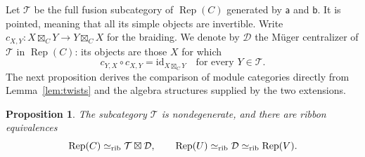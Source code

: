 \documentclass[11pt,reqno]{amsart}
\newtheorem{proposition}[theorem]{Proposition}
\theoremstyle{definition}\newtheorem{definition}[theorem]{Definition}
\theoremstyle{remark}\newtheorem{remark}[theorem]{Remark}
\newcommand{\Rep}{\operatorname{Rep}}
\newcommand{\Tc}{\mathcal T}\newcommand{\D}{\mathcal D}
\numberwithin{equation}{section}
\begin{document}
Let $\Tc$ be the full fusion subcategory of $\Rep(C)$ generated by $\mathsf a$ and $\mathsf b$. It is pointed, meaning that all its simple objects are invertible. Write $c_{X,Y}:X\boxtimes_C Y\longrightarrow Y\boxtimes_C X$ for the braiding. We denote by $\D$ the M\"uger centralizer of $\Tc$ in $\Rep(C)$: its objects are those $X$ for which
\[
 c_{Y,X}\circ c_{X,Y}=\mathrm{id}_{X\boxtimes_C Y}
 \quad\text{for every }Y\in\Tc.
\]
The next proposition derives the comparison of module categories directly from Lemma~\ref{lem:twists} and the algebra structures supplied by the two extensions.

\begin{proposition}\label{prop:categories}
The subcategory $\Tc$ is nondegenerate, and there are ribbon equivalences
\[
 \Rep(C)\simeq_{\rm rib}\Tc\boxtimes\D,
 \qquad \Rep(U)\simeq_{\rm rib}\D\simeq_{\rm rib}\Rep(V).
\]
\end{proposition}
\end{document}

